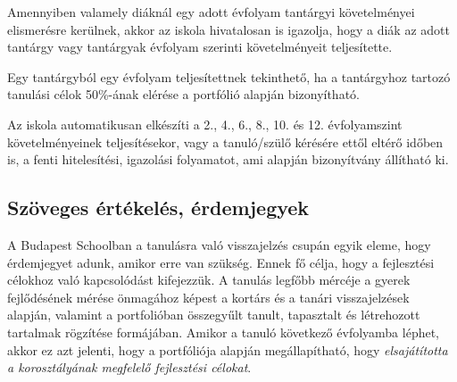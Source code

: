 Amennyiben valamely diáknál egy adott évfolyam tantárgyi követelményei
elismerésre kerülnek, akkor az iskola hivatalosan is igazolja, hogy a diák az
adott tantárgy vagy tantárgyak évfolyam szerinti követelményeit teljesítette.

Egy tantárgyból egy évfolyam teljesítettnek tekinthető, ha a tantárgyhoz
tartozó tanulási célok 50\%-ának elérése a portfólió alapján bizonyítható.

Az iskola automatikusan elkészíti a 2., 4., 6., 8., 10. és 12. évfolyamszint
követelményeinek teljesítésekor, vagy a tanuló/szülő kérésére ettől eltérő
időben is, a fenti hitelesítési, igazolási folyamatot, ami alapján bizonyítvány
állítható ki.

\subsection{Szöveges értékelés, érdemjegyek}

A Budapest Schoolban a tanulásra való visszajelzés csupán egyik eleme, hogy
érdemjegyet adunk, amikor erre van szükség. Ennek fő célja, hogy a fejlesztési
célokhoz való kapcsolódást kifejezzük. A tanulás legfőbb mércéje a gyerek
fejlődésének mérése önmagához képest a kortárs és a tanári visszajelzések
alapján, valamint a portfolióban összegyűlt tanult, tapasztalt és létrehozott
tartalmak rögzítése formájában.  Amikor a tanuló következő évfolyamba léphet,
akkor ez azt jelenti, hogy a portfóliója alapján megállapítható, hogy
\emph{elsajátította a korosztályának megfelelő fejlesztési célokat}.
